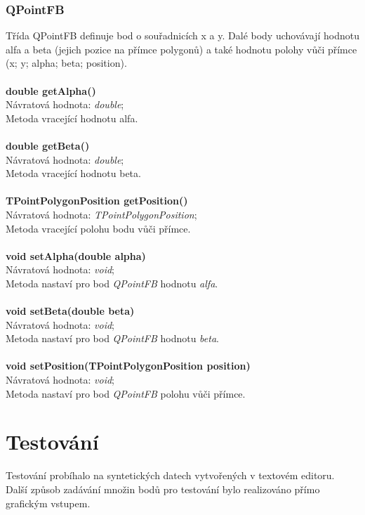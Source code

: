\documentclass[a4paper, 12pt]{article}
\begin{document}
\subsubsection{QPointFB}
Třída QPointFB definuje bod o souřadnicích x a y. Dalé body uchovávají hodnotu alfa a beta (jejich pozice na přímce polygonů) a také hodnotu polohy vůči přímce (x; y; alpha; beta; position).\\
\\
\textbf{double getAlpha()}\\
Návratová hodnota: \textit{double};\\
Metoda vracející hodnotu alfa.\\
\\
\textbf{double getBeta()}\\
Návratová hodnota: \textit{double};\\
Metoda vracející hodnotu beta.\\
\\
\textbf{TPointPolygonPosition getPosition()}\\
Návratová hodnota: \textit{TPointPolygonPosition};\\
Metoda vracející polohu bodu vůči přímce.\\
\\
\textbf{void setAlpha(double alpha)}\\
Návratová hodnota: \textit{void};\\
Metoda nastaví pro bod \textit{QPointFB} hodnotu \textit{alfa}.\\
\\
\textbf{void setBeta(double beta)}\\
Návratová hodnota: \textit{void};\\
Metoda nastaví pro bod \textit{QPointFB} hodnotu \textit{beta}.\\
\\
\textbf{void setPosition(TPointPolygonPosition position)}\\
Návratová hodnota: \textit{void};\\
Metoda nastaví pro bod \textit{QPointFB} polohu vůči přímce.

\section{Testování}
Testování probíhalo na syntetických datech vytvořených v textovém editoru. Další způsob zadávání množin bodů pro testování bylo realizováno přímo grafickým vstupem.
\end{document}
